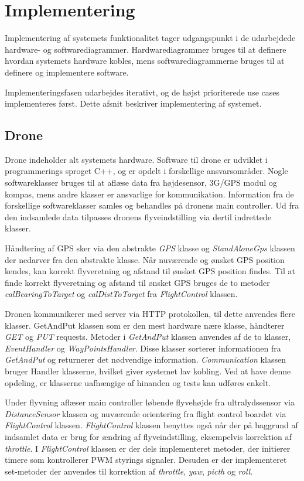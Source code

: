 \section{Implementering}
Implementering af systemets funktionalitet tager udgangspunkt i de udarbejdede hardware- og softwarediagrammer. Hardwarediagrammer bruges til at definere hvordan systemets hardware kobles, mens softwarediagrammerne bruges til at definere og implementere software.

Implementeringsfasen udarbejdes iterativt, og de højst prioriterede use cases implementeres først. 
Dette afsnit beskriver implementering af systemet.

\subsection{Drone}
Drone indeholder alt systemets hardware. Software til drone er udviklet i programmerings sproget C++, og er opdelt i forskellige ansvarsområder. Nogle softwareklasser bruges til at aflæse data fra højdesensor, 3G/GPS modul og kompas, mens andre klasser er ansvarlige for kommunikation. Information fra de forskellige softwareklasser samles og behandles på dronens main controller. Ud fra den indsamlede data tilpasses dronens flyveindstilling via dertil indrettede klasser. 

Håndtering af GPS sker via den abstrakte \textit{GPS} klasse og \textit{StandAloneGps} klassen der nedarver fra den abstrakte klasse. Når nuværende og ønsket GPS position kendes, kan korrekt flyveretning og afstand til ønsket GPS position findes. Til at finde korrekt flyveretning og afstand til ønsket GPS bruges de to metoder \textit{calBearingToTarget} og \textit{calDistToTarget} fra \textit{FlightControl} klassen. 

Dronen kommunikerer med server via HTTP protokollen, til dette anvendes flere klasser. GetAndPut klassen som er den mest hardware nære klasse, håndterer \textit{GET} og \textit{PUT} requests. Metoder i \textit{GetAndPut} klassen anvendes af de to klasser, \textit{EventHandler} og \textit{WayPointsHandler}. Disse klasser sorterer informationen fra \textit{GetAndPut} og returnerer det nødvendige information. \textit{Communication} klassen bruger Handler klasserne, hvilket giver systemet lav kobling. Ved at have denne opdeling, er klasserne uafhængige af hinanden og tests kan udføres enkelt.

Under flyvning aflæser main controller løbende flyvehøjde fra ultralydssensor via \textit{DistanceSensor} klassen og nuværende orientering fra flight control boardet via \textit{FlightControl} klassen. \textit{FlightControl} klassen benyttes også når der på baggrund af indsamlet data er brug for ændring af flyveindstilling, eksempelvis korrektion af \textit{throttle}. I \textit{FlightControl} klassen er der dels implementeret metoder, der initierer timere som kontrollerer PWM styrings signaler. Desuden er der implementeret set-metoder der anvendes til korrektion af \textit{throttle}, \textit{yaw}, \textit{picth} og \textit{roll}.  


